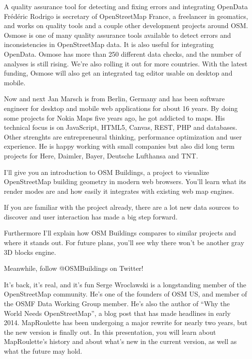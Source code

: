 %
{A quality assurance tool for detecting and fixing errors and integrating OpenData}%
{Frédéric Rodrigo is secretary of OpenStreetMap France, a freelancer in geomatics, and works on quality tools and a couple other development projects around OSM.}%
{Osmose is one of many quality assurance tools available to detect errors and inconsistencies in OpenStreetMap data. It is also useful for integrating OpenData. Osmose has more than 250 different data checks, and the number of analyses is still rising. We're also rolling it out for more countries. With the latest funding, Osmose will also get an integrated tag editor usable on desktop and mobile.}

%
{Now and next}%
{Jan Marsch is from Berlin, Germany and has been software engineer for desktop and mobile web applications for about 16 years. By doing some projects for Nokia Maps five years ago, he got addicted to maps. His technical focus is on JavaScript, HTML5, Canvas, REST, PHP and databases. Other strenghts are entrepreneural thinking, performance optimization and user experience. He is happy working with small companies but also did long term projects for Here, Daimler, Bayer, Deutsche Lufthansa and TNT.}%
{I'll give you an introduction to OSM Buildings, a project to visualize OpenStreetMap building geometry in modern web browsers. You'll learn what its render modes are and how easily it integrates with existing web map engines.

If you are familiar with the project already, there are a lot new data sources to discover and user interaction has made a big step forward.

Furthermore I’ll explain how OSM Buildings compares to similar projects and where it stands out. For future plans, you'll see why there won't be another gray 3D blocks engine.

Meanwhile, follow @OSMBuildings on Twitter!}


%
{It's back, it's real, and it's fun}%
{Serge Wroclawski is a longstanding member of the OpenStreetMap community. He's one of the founders of OSM US, and member of the OSMF Data Working Group member. He's also the author of ``Why the World Needs OpenStreetMap'', a blog post that has made headlines in early 2014.}%
{MapRoulette has been undergoing a major rewrite for nearly two years, but the new version is finally out. In this presentation, you will learn about MapRoulette's history and about what's new in the current version, as well as what the future may hold.}

